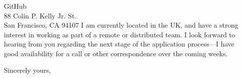 \documentclass[11pt]{letter} %
\begin{document}
\begin{letter}{GitHub\\
88 Colin P. Kelly Jr. St.\\
San Francisco, CA 94107}
I am currently located in the UK, and have a strong interest in working as part
of a remote or distributed team. I look forward to hearing from you regarding
the next stage of the application process---I have good availability for a call
or other correspondence over the coming weeks.

\closing{Sincerely yours,}




\end{letter}
\end{document}
